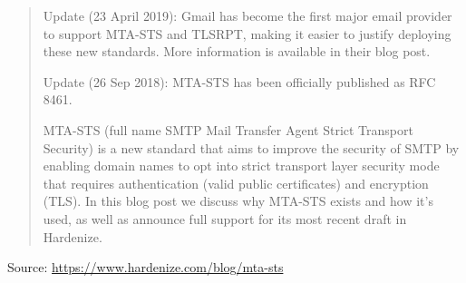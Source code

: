 \documentclass[Screen16to9,17pt]{foils}
\begin{document}
\begin{quote}
Update (23 April 2019): Gmail has become the first major email provider to support MTA-STS and TLSRPT, making it easier to justify deploying these new standards. More information is available in their blog post.

Update (26 Sep 2018): MTA-STS has been officially published as RFC 8461.

MTA-STS (full name SMTP Mail Transfer Agent Strict Transport Security) is a new standard that aims to improve the security of SMTP by enabling domain names to opt into strict transport layer security mode that requires authentication (valid public certificates) and encryption (TLS). In this blog post we discuss why MTA-STS exists and how it's used, as well as announce full support for its most recent draft in Hardenize.
\end{quote}

Source: \url{https://www.hardenize.com/blog/mta-sts}


\slidenext
\end{document}
